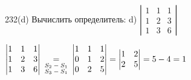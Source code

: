 \begin{problem}{232(d)}
Вычислить определитель:
d) $\left| \begin{array}{rrr}1 & 1 & 1 \\ 1 & 2 & 3 \\ 1 & 3 & 6 \end{array} \right|$ 

\end{problem}
\begin{solution}
$
\begin{vmatrix}
	1 & 1 & 1\\
	1 & 2 & 3\\
	1 & 3 & 6\\
\end{vmatrix} \:
\underset{\begin{subarray}{l}{\text{$S_2-S_1$}}\\
	\text{$S_3-S_1$}\end{subarray}}{=} \:
\begin{vmatrix}
	1 & 1 & 1\\
	0 & 1 & 2\\
	0 & 2 & 5
\end{vmatrix} =
\begin{vmatrix}
	1 & 2\\
	2 & 5\\
\end{vmatrix}=5-4=1
$

\end{solution} 

